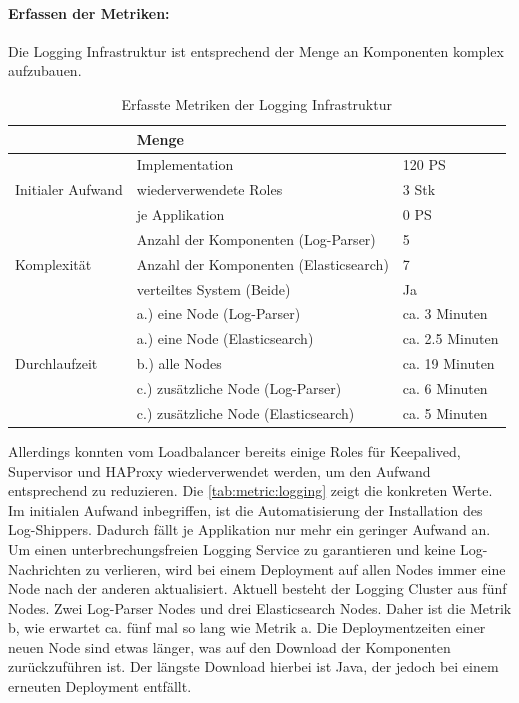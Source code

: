 \paragraph{Erfassen der Metriken:}
Die Logging Infrastruktur ist entsprechend der Menge an Komponenten komplex aufzubauen.
\begin{table}[ht]
\setlength{\tabcolsep}{5pt}
\renewcommand{\arraystretch}{1.5}
\centering
\begin{tabular}{|l|l|l|}
\hline
\rowcolor[HTML]{C0C0C0}
\multicolumn{2}{|c|}{\textbf{Metrik}} & \textbf{Menge}					\\ 
\hline
\multirow{3}{*}{Initialer Aufwand}	& Implementation & 120 PS	\\ 
\cline{2-3}
									& wiederverwendete Roles & 3 Stk		\\
\cline{2-3}
									& je Applikation 		& 0 PS 	\\
\hline 
\multirow{3}{*}{Komplexität}		& Anzahl der Komponenten (Log-Parser) & 5 \\
\cline{2-3}
								& Anzahl der Komponenten (Elasticsearch) & 7\\
\cline{2-3}
								& verteiltes System (Beide)		& Ja 	\\
\hline
\multirow{5}{*}{Durchlaufzeit} & a.) eine Node (Log-Parser) & ca. 3 Minuten \\ 
\cline{2-3} 
						& a.) eine Node (Elasticsearch) & ca. 2.5 Minuten \\
\cline{2-3} 

						& b.) alle Nodes					& ca. 19 Minuten	 \\ 
\cline{2-3}							
						& c.) zusätzliche Node (Log-Parser)	& ca. 6 Minuten 		\\
\cline{2-3}
						& c.) zusätzliche Node (Elasticsearch)	& ca. 5 Minuten 	\\
\hline
\end{tabular} 
\caption{Erfasste Metriken der Logging Infrastruktur}
\label{tab:metric:logging}
\end{table}
Allerdings konnten vom Loadbalancer bereits einige Roles für Keepalived, Supervisor und HAProxy wiederverwendet werden, um den Aufwand entsprechend zu reduzieren. Die \autoref{tab:metric:logging} zeigt die konkreten Werte. Im initialen Aufwand inbegriffen, ist die Automatisierung der Installation des Log-Shippers. Dadurch fällt je Applikation nur mehr ein geringer Aufwand an. Um einen unterbrechungsfreien Logging Service zu garantieren und keine Log-Nachrichten zu verlieren, wird bei einem Deployment auf allen Nodes immer eine Node nach der anderen aktualisiert. Aktuell besteht der Logging Cluster aus fünf Nodes. Zwei Log-Parser Nodes und drei Elasticsearch Nodes. Daher ist die Metrik b, wie erwartet ca. fünf mal so lang wie Metrik a. Die Deploymentzeiten einer neuen Node sind etwas länger, was auf den Download der Komponenten zurückzuführen ist. Der längste Download hierbei ist Java, der jedoch bei einem erneuten Deployment entfällt.

